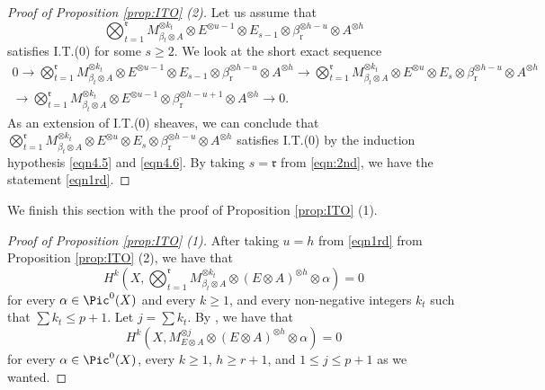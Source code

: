 \documentclass[11pt,letter]{amsart}
\numberwithin{equation}{section}
\begin{document}
\begin{proof}[Proof of Proposition \ref{prop:ITO} (2)]
Let us assume that 
\begin{equation}\label{eqn4.6}
\bigotimes_{t=1}^{\mathfrak{r}}M_{\beta_t\otimes A}^{\otimes k_t}\otimes E^{\otimes u-1}\otimes E_{s-1}\otimes \beta_{\mathrm{r}}^{\otimes h-u}\otimes A^{\otimes h}
\end{equation}
satisfies I.T.(0) for some $s\geq 2$. We look at the short exact sequence
\begin{align*}
0\rightarrow \bigotimes_{t=1}^{\mathfrak{r}}M_{\beta_t\otimes A}^{\otimes k_t}\otimes E^{\otimes u-1}\otimes E_{s-1}\otimes \beta_{\mathrm{r}}^{\otimes h-u}\otimes A^{\otimes h}\longrightarrow \bigotimes_{t=1}^{\mathfrak{r}}M_{\beta_t\otimes A}^{\otimes k_t}\otimes E^{\otimes u}\otimes E_s\otimes\beta_{\mathrm{r}}^{\otimes h-u}\otimes A^{\otimes h}\\
\longrightarrow \bigotimes_{t=1}^{\mathfrak{r}}M_{\beta_t\otimes A}^{\otimes k_t}\otimes E^{\otimes u-1}\otimes \beta_{\mathrm{r}}^{\otimes h-u+1}\otimes A^{\otimes h}\rightarrow 0.
\end{align*}
As an extension of I.T.(0) sheaves, we can conclude that $\bigotimes_{t=1}^{\mathfrak{r}}M_{\beta_t\otimes A}^{\otimes k_t}\otimes E^{\otimes u}\otimes E_s\otimes\beta_{\mathrm{r}}^{\otimes h-u}\otimes A^{\otimes h}$ satisfies I.T.(0) by the induction hypothesis \eqref{eqn4.5} and \eqref{eqn4.6}. By taking $s=\mathfrak{r}$ from \eqref{eqn:2nd}, we have the statement \eqref{eqn1rd}.
  \end{proof}












We finish this section with the proof of Proposition \ref{prop:ITO} (1).


   \begin{proof}[Proof of Proposition \ref{prop:ITO} (1)]  
   After taking $u=h$ from \eqref{eqn1rd} from Proposition \ref{prop:ITO} (2), we have that 
   \[H^k\left(X,\bigotimes_{t=1}^\mathfrak{r} M_{\beta_t\otimes A}^{\otimes k_t}\otimes (E\otimes A)^{\otimes h} \otimes\alpha\right)=0\] for every $\alpha\in\Pic^0(X)$ and every $k\ge 1$, and every non-negative integers $k_t$ such that $\sum k_t\leq p+1$. Let $j=\sum k_t$. By \cite[Lemma 4.4]{Chi19}, we have that 
   \[H^k\left(X,M_{E\otimes A}^{\otimes j}\otimes (E\otimes A)^{\otimes h} \otimes\alpha\right)=0\] for every $\alpha\in\Pic^0(X)$, every $k\ge 1$, $h\geq r+1$, and $1\leq j\leq p+1$ as we wanted.
   \end{proof}
   
\end{document}
